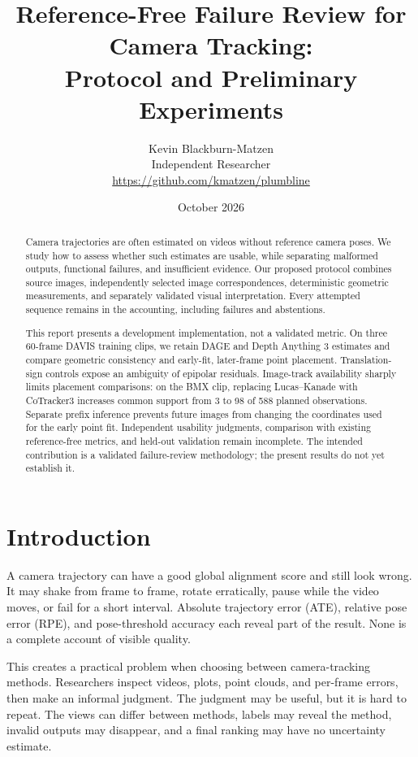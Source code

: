 \documentclass[10pt,twocolumn]{article}
\title{Reference-Free Failure Review for Camera Tracking:\\Protocol and Preliminary Experiments}
\author{Kevin Blackburn-Matzen\\\small Independent Researcher\\\small \url{https://github.com/kmatzen/plumbline}}
\date{October 2026}
\begin{document}
\maketitle
\begin{abstract}
Camera trajectories are often estimated on videos without reference camera poses. We study how to assess whether such estimates are usable, while separating malformed outputs, functional failures, and insufficient evidence. Our proposed protocol combines source images, independently selected image correspondences, deterministic geometric measurements, and separately validated visual interpretation. Every attempted sequence remains in the accounting, including failures and abstentions.

This report presents a development implementation, not a validated metric. On three 60-frame DAVIS training clips, we retain DAGE and Depth Anything 3 estimates and compare geometric consistency and early-fit, later-frame point placement. Translation-sign controls expose an ambiguity of epipolar residuals. Image-track availability sharply limits placement comparisons: on the BMX clip, replacing Lucas--Kanade with CoTracker3 increases common support from 3 to 98 of 588 planned observations. Separate prefix inference prevents future images from changing the coordinates used for the early point fit. Independent usability judgments, comparison with existing reference-free metrics, and held-out validation remain incomplete. The intended contribution is a validated failure-review methodology; the present results do not yet establish it.
\end{abstract}

\section{Introduction}
A camera trajectory can have a good global alignment score and still look wrong. It may shake from frame to frame, rotate erratically, pause while the video moves, or fail for a short interval. Absolute trajectory error (ATE), relative pose error (RPE), and pose-threshold accuracy each reveal part of the result. None is a complete account of visible quality.

This creates a practical problem when choosing between camera-tracking methods. Researchers inspect videos, plots, point clouds, and per-frame errors, then make an informal judgment. The judgment may be useful, but it is hard to repeat. The views can differ between methods, labels may reveal the method, invalid outputs may disappear, and a final ranking may have no uncertainty estimate.
\end{document}
